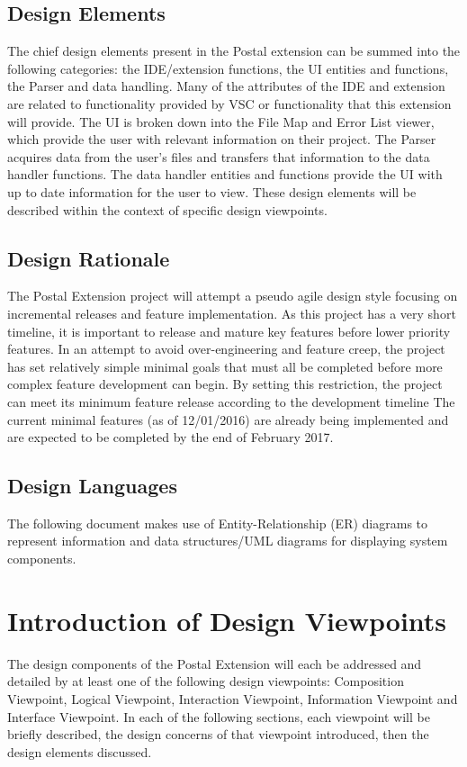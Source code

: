 \documentclass[letterpaper,10pt,titlepage,draftclsnofoot,onecolumn,onesided] {IEEEtran}
\begin{document}
\subsection{Design Elements}
The chief design elements present in the Postal extension can be summed into the following categories: the IDE/extension functions, the UI entities and functions, the Parser and data handling.
Many of the attributes of the IDE and extension are related to functionality provided by VSC or functionality that this extension will provide. 
The UI is broken down into the File Map and Error List viewer, which provide the user with relevant information on their project.
The Parser acquires data from the user's files and transfers that information to the data handler functions.
The data handler entities and functions provide the UI with up to date information for the user to view.
These design elements will be described within the context of specific design viewpoints.

\subsection{Design Rationale}
The Postal Extension project will attempt a pseudo agile design style focusing on incremental releases and feature implementation.
As this project has a very short timeline, it is important to release and mature key features before lower priority features. 
In an attempt to avoid over-engineering and feature creep, the project has set relatively simple minimal goals that must all be completed before more complex feature development can begin.
By setting this restriction, the project can meet its minimum feature release according to the development timeline
The current minimal features (as of 12/01/2016) are already being implemented and are expected to be completed by the end of February 2017.


\subsection{Design Languages}
The following document makes use of Entity-Relationship (ER) diagrams to represent information and data structures/UML diagrams for displaying system components. 

\section{Introduction of Design Viewpoints}
The design components of the Postal Extension will each be addressed and detailed by at least one of the following design viewpoints: Composition Viewpoint, Logical Viewpoint, Interaction Viewpoint, Information Viewpoint and Interface Viewpoint.
In each of the following sections, each viewpoint will be briefly described, the design concerns of that viewpoint introduced, then the design elements discussed.
\end{document}
